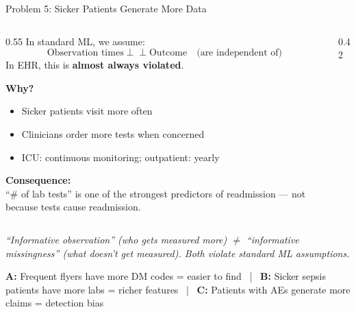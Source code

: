 \documentclass[aspectratio=169,10pt]{beamer}
\begin{document}
\begin{frame}{Problem 5: Sicker Patients Generate More Data}
\begin{columns}[T]
\begin{column}{0.55\textwidth}
In standard ML, we assume:
\[
    \text{Observation times} \perp\!\!\!\perp \text{Outcome} \quad \text{(are independent of)}
\]
In EHR, this is \textbf{almost always violated}.

\vspace{0.5em}
\textbf{Why?}
\begin{itemize}
    \item Sicker patients visit more often
    \item Clinicians order more tests when concerned
    \item ICU: continuous monitoring; outpatient: yearly
\end{itemize}

\vspace{0.5em}
\textbf{Consequence:}\\
``\# of lab tests'' is one of the strongest predictors of readmission --- not because tests cause readmission.
\end{column}
\begin{column}{0.42\textwidth}
\end{column}
\end{columns}

\vspace{0.2em}
\scriptsize \textit{``Informative observation'' (who gets measured more) $\neq$ ``informative missingness'' (what doesn't get measured). Both violate standard ML assumptions.}

\begin{center}\tiny
\textbf{\color{columbia}A:} Frequent flyers have more DM codes = easier to find ~|~ \textbf{\color{columbiaaccent}B:} Sicker sepsis patients have more labs = richer features ~|~ \textbf{\color{columbiagray}C:} Patients with AEs generate more claims = detection bias
\end{center}
\end{frame}
\end{document}

